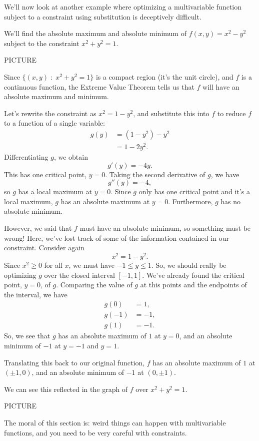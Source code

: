 \documentclass{ximera}
\begin{document}
We'll now look at another example where optimizing a multivariable function subject to a constraint using substitution is deceptively difficult.

\begin{example}
We'll find the absolute maximum and absolute minimum of $f(x,y) = x^2-y^2$ subject to the constraint $x^2+y^2=1$.

PICTURE

Since $\{(x,y)\;:\;x^2+y^2=1\}$ is a compact region (it's the unit circle), and $f$ is a continuous function, the Extreme Value Theorem tells us that $f$ will have an absolute maximum and minimum.

Let's rewrite the constraint as $x^2=1-y^2$, and substitute this into $f$ to reduce $f$ to a function of a single variable:
\begin{align*}
g(y) &= (1-y^2)-y^2\\
&= 1-2y^2.
\end{align*}
Differentiating $g$, we obtain
\[
g'(y) = -4y.
\]
This has one critical point, $y=0$. Taking the second derivative of $g$, we have
\[
g''(y) = -4,
\] 
so $g$ has a local maximum at $y=0$. Since $g$ only has one critical point and it's a local maximum, $g$ has an absolute maximum at $y=0$. Furthermore, $g$ has no absolute minimum.

However, we said that $f$ must have an absolute minimum, so something must be wrong! Here, we've lost track of some of the information contained in our constraint. Consider again
\[
x^2= 1-y^2.
\]
Since $x^2\geq 0$ for all $x$, we must have $-1\leq y\leq 1$. So, we should really be optimizing $g$ over the closed interval $[-1,1]$. We've already found the critical point, $y=0$, of $g$. Comparing the value of $g$ at this points and the endpoints of the interval, we have
\begin{align*}
g(0) &= 1,\\
g(-1) &=-1,\\
g(1) &= -1.
\end{align*}
So, we see that $g$ has an absolute maximum of $1$ at $y=0$, and an absolute minimum of $-1$ at $y=-1$ and $y=1$.

Translating this back to our original function, $f$ has an absolute maximum of $1$ at $(\pm 1, 0)$, and an absolute minimum of $-1$ at $(0,\pm 1)$.

We can see this reflected in the graph of $f$ over $x^2+y^2=1$.

PICTURE

\end{example}

The moral of this section is: weird things can happen with multivariable functions, and you need to be very careful with constraints.
\end{document}
